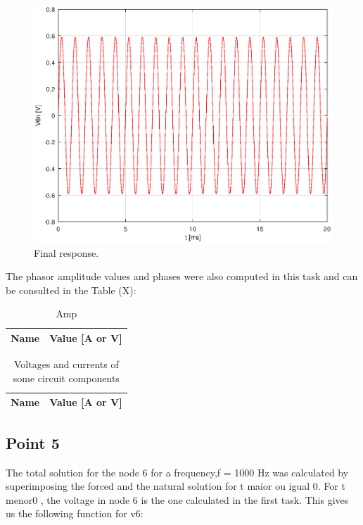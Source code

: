 \begin{figure}[H] \centering
\includegraphics[width=0.6\linewidth]{Forced4.eps}
\caption{Final response.}
\label{fig:point4}
\end{figure}

The phasor amplitude values and phases were also computed in this task and can be consulted in the Table (X):
\begin{table}[H]
  \centering
  \begin{tabular}{|l|r|}
    \hline    
    {\bf Name} & {\bf Value [A or V]} \\ \hline
    
  \end{tabular}
  \caption{Amp}
  \label{tab:amp}
\end{table}

\begin{table}[H]
  \centering
  \begin{tabular}{|l|r|}
    \hline    
    {\bf Name} & {\bf Value [A or V]} \\ \hline
    
  \end{tabular}
  \caption{Voltages and currents of some circuit components}
  \label{tab:phases}
\end{table}

\subsection{Point 5}
The total solution for the node 6 for a frequency,f = 1000 Hz was calculated by superimposing
the forced and the natural solution for t maior ou igual 0. For t menor0 , the voltage in node 6 is the
one calculated in the first task. This gives us the following function for v6:


